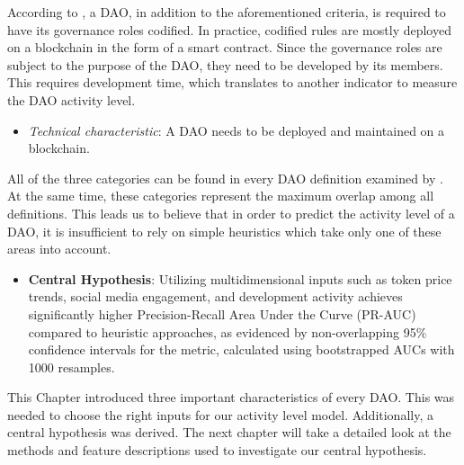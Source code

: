 According to \textcite{dupont2017experiments}, a DAO, in addition to the aforementioned criteria, is required to have its governance roles codified. 
In practice, codified rules are mostly deployed on a blockchain in the form of a smart contract. 
Since the governance roles are subject to the purpose of the DAO, they need to be developed by its members. 
This requires development time, which translates to another indicator to measure the DAO activity level.
\begin{itemize}
    \item \textit{Technical characteristic}: A DAO needs to be deployed and maintained on a blockchain.
\end{itemize}

All of the three categories can be found in every DAO definition examined by \textcite{rikken2023ins}. 
At the same time, these categories represent the maximum overlap among all definitions. 
This leads us to believe that in order to predict the activity level of a DAO, it is insufficient to rely on simple heuristics which take only one of these areas into account.
\begin{itemize}
    \item \textbf{Central Hypothesis}: Utilizing multidimensional inputs such as token price trends, social media engagement, and development activity achieves significantly higher Precision-Recall Area Under the Curve (PR-AUC) compared to heuristic approaches, as evidenced by non-overlapping 95\% confidence intervals for the metric, calculated using bootstrapped AUCs with 1000 resamples.
\end{itemize}

\noindent This Chapter introduced three important characteristics of every DAO. 
This was needed to choose the right inputs for our activity level model. 
Additionally, a central hypothesis was derived. 
The next chapter will take a detailed look at the methods and feature descriptions used to investigate our central hypothesis.
